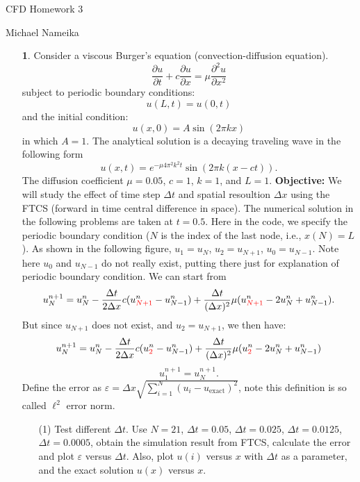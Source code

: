 \documentclass{article}
\begin{document}
\begin{center}
    {\huge CFD Homework 3}
    \vspace{0.5cm}

    {\large Michael Nameika}
    \vspace{0.5cm}
\end{center}

\begin{itemize}
    \item[\textbf{1}.] Consider a viscous Burger's equation (convection-diffusion equation).
    \[\frac{\partial u}{\partial t} + c\frac{\partial u}{\partial x} = \mu\frac{\partial^2u}{\partial x^2}\]
    subject to periodic boundary conditions:
    \[u(L,t) = u(0,t)\]
    and the initial condition:
    \[u(x,0) = A\sin(2\pi k x)\]
    in which $A = 1$.
    \newline\newline
    The analytical solution is a decaying traveling wave in the following form
    \[u(x,t) = e^{-\mu 4\pi^2k^2t}\sin(2\pi k(x - ct)).\]
    The diffusion coefficient $\mu = 0.05$, $c = 1$, $k = 1$, and $L = 1$.
    \newline\newline
    \textbf{Objective:} We will study the effect of time step $\Delta t$ and spatial resoultion $\Delta x$ using the FTCS (forward in time central difference in space). The numerical solution in the following problems are taken at $t = 0.5$. Here in the code, we specify the periodic boundary condition ($N$ is the index of the last node, i.e., $x(N) = L$). As shown in the following figure, $u_1 = u_N$, $u_2 = u_{N+1}$, $u_0 = u_{N-1}$. Note here $u_0$ and $u_{N-1}$ do not really exist, putting there just for explanation of periodic boundary condition. We can start from
    \[u_{N}^{n + 1} = u_N^n - \frac{\Delta t}{2\Delta x}c(u^n_{\color{red} N+1} - u_{N-1}^n) + \frac{\Delta t}{(\Delta x)^2}\mu(u^n_{\color{red} N+1} - 2u_N^n + u_{N-1}^n).\]
    But since $u_{N+1}$ does not exist, and $u_2 = u_{N+1}$, we then have:
    \[u_{N}^{n + 1} = u_N^n - \frac{\Delta t}{2\Delta x}c(u^n_{\color{red} 2} - u_{N-1}^n) + \frac{\Delta t}{(\Delta x)^2}\mu(u^n_{\color{red} 2} - 2u_N^n + u_{N-1}^n)\]
    \[u_1^{n+1} = u_{N}^{n+1}.\]
    Define the error as $\varepsilon = \Delta x\sqrt{\displaystyle \sum_{i = 1}^N (u_i - u_{\text{exact}})^2 }$, note this definition is so called $\ell^2$ error norm.
    \begin{itemize}
        \item[(1)] Test different $\Delta t$. Use $N = 21$, $\Delta t = 0.05$, $\Delta t = 0.025$, $\Delta t = 0.0125$, $\Delta t = 0.0005$, obtain the simulation result from FTCS, calculate the error and plot $\varepsilon$ versus $\Delta t.$ Also, plot $u(i)$ versus $x$ with $\Delta t$ as a parameter, and the exact solution $u(x)$ versus $x$. 

\end{itemize}
\end{itemize}
\end{document}
